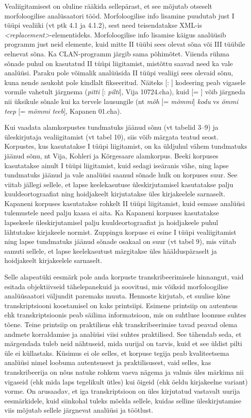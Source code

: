 \documentclass[12pt]{article}
\begin{document}
Vealiigitamisest on oluline rääkida sellepärast, et see mõjutab otseselt morfoloogilise analüsaatori tööd. Morfoloogilise info lisamine puudutab just I tüüpi vealiiki (vt ptk 4.1 ja 4.1.2), sest need teisendatakse XML-is \emph{<replacement>}-elementideks. Morfoloogilise info lisamise käigus analüüsib programm just neid elemente, kuid mitte II tüübi sees olevat sõna või III tüübile eelnevat sõna. Ka CLAN-programm järgib sama põhimõtet. Viienda rühma sõnade puhul on kasutatud II tüüpi liigitamist, mistõttu saavad need ka vale analüüsi. Paraku pole võimalik analüüsida II tüüpi vealiigi sees olevaid sõnu, kuna nende asukoht pole kindlalt fikseeritud. Näiteks [: ] kodeering peab vigasele vormile vahetult järgnema (\emph{pitti} [: \emph{pilti}], Vija 10724.cha), kuid [= ] võib järgneda nii üksikule sõnale kui ka tervele lausungile (nt \emph{mõh} [= \emph{mõmmi}] \emph{kodu} vs \emph{õmmi teep} [= \emph{mõmmi teeb}], Kapanen 01.cha).

Kui vaadata alamkorpustes tundmatuks jäänud sõnu (vt tabelid 3--9) ja üleskirjutaja vealiigitamist (vt tabel 10), siis võib märgata teatud seost. Korpustes, kus kasutatakse I tüüpi liigitamist, on ka üldjuhul vähem tundmatuks jäänud sõnu, nt Vija, Kohleri ja Kõrgesaare alamkorpus. Beeki korpuses kasutatakse ainult I tüüpi liigitamist, kuid sedagi iseäranis vähe, ning lapse tundmatuks jäänud ja vale analüüsi saanud sõnade hulk on korpuses suur. See viitab jällegi sellele, et lapse keelekasutuse üleskirjutamisel kasutatakse palju kuuldeortograafiat ning hoidjakeelt kirjutatakse üles kirjakeelele sarnaselt. Kapaneni korpuses kasutatakse rohkelt II tüüpi liigitamist, kuid esmase analüüsi tulemustele need palju kaasa ei aita. Ka Kapaneni korpuses kasutatakse lapsekeele üleskirjutamisel palju kuuldeortograafiat ja hoidjakeele puhul lähtutakse kirjakeele normist. Zuppingu korpuse ei esine I tüüpi vealiigitamist ning lapse tundmatuks jäänud sõnade osakaal on suur (vt tabel 9), mis viitab samuti sellele, et lapse keelekasutust märgitakse üles häälduspäraselt ja hoidjakeelt kirjakeelele sarnaselt.

Selle alapeatüki eesmärk pole anda korpuste transkribeerimisele hinnangut, vaid esitada objektiivseid tähelepanekuid ja soovitusi, mis võiksid morfoloogilise analüüsaatori väljundit paremaks muuta. Hennoste kirjutab, et suulise kõne transkriptsiooni koostamisel on kaks printsiipi. Esimene printsiip on autentsus ehk transkriptsioonis peab säilima informatsioon, mis on suhtluse loomuse suhtes tõene. Teine printsiip on praktilisus ehk transkribeerimise tavad peavad olema andmete korraldamise ja analüüsi viisi suhtes praktilised. See tähendab seda, et märgendada tuleb neid nähtuseid, mida uurijal on tarvis, kuid et see üldist pilti üle ei küllastaks. \citep[92--93]{Hennoste} Küsimus ei ole selles, et korpuse tegija peab kvaliteetsema analüüsi nimel loobuma autentsusest ja praktilisusest, vaid selles, kas transkribeerija on nõus natuke rohkem vaeva nägema ja valmis üles märkima nii vigaseid (ehk mida laps tegelikult ütles) kui õigeid (ehk öeldu kirjakeelne variant) vorme. On arusaadav, et iga transkriptsioon on üles kirjutatud vastavalt uurija eesmärkidele, kuid siinkohal tuleks mõelda sellele, kuidas selline üleskirjutamise viis mõjutab sellele järgnevat analüüsi ja töötlust.
\end{document}
